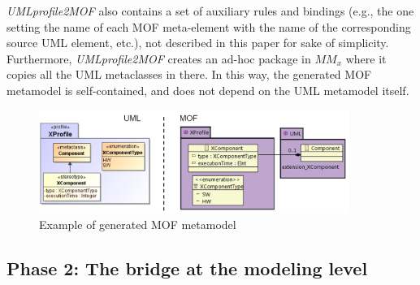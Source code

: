 %
\textit{UMLprofile2MOF} also contains a set of auxiliary rules and bindings (e.g., the one setting the name of each MOF meta-element with the name of the corresponding source UML element, etc.), not described in this paper for sake of simplicity. Furthermore, \textit{UMLprofile2MOF} creates an ad-hoc package in $MM_x$ where it copies all the UML metaclasses in there. In this way, the generated MOF metamodel is self-contained, and does not depend on the UML metamodel itself.
\vspace{-.2cm}
\begin{figure}[htbp]
	\centering
		\includegraphics[width=0.90\textwidth]{figures/metamodelingExample.png}
	\caption{Example of generated MOF metamodel}
	\label{fig:metamodelingExample}
\end{figure}
\vspace{-.3cm}
\subsection{Phase 2: The bridge at the modeling level}\label{sec:modeLevel}


